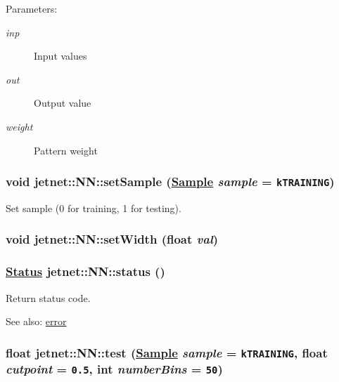 \begin{Desc}
\item[Parameters:]
\begin{description}
\item[{\em inp}]Input values \item[{\em out}]Output value \item[{\em weight}]Pattern weight \end{description}
\end{Desc}
\hypertarget{classjetnet_1_1NN_a13}{
\subsubsection[setSample]{\setlength{\rightskip}{0pt plus 5cm}void jetnet::NN::set\-Sample (\hyperlink{classjetnet_1_1NN_w17}{Sample} {\em sample} = {\tt kTRAINING})}}
\label{classjetnet_1_1NN_a13}


Set sample (0 for training, 1 for testing). 

\hypertarget{classjetnet_1_1NN_a10}{
\subsubsection[setWidth]{\setlength{\rightskip}{0pt plus 5cm}void jetnet::NN::set\-Width (float {\em val})}}
\label{classjetnet_1_1NN_a10}


\hypertarget{classjetnet_1_1NN_a34}{
\subsubsection[status]{\setlength{\rightskip}{0pt plus 5cm}\hyperlink{classjetnet_1_1NN_w19}{Status} jetnet::NN::status ()}}
\label{classjetnet_1_1NN_a34}


Return status code. 

\begin{Desc}
\item[See also:]\hyperlink{classjetnet_1_1NN_a28}{error} \end{Desc}
\hypertarget{classjetnet_1_1NN_a24}{
\subsubsection[test]{\setlength{\rightskip}{0pt plus 5cm}float jetnet::NN::test (\hyperlink{classjetnet_1_1NN_w17}{Sample} {\em sample} = {\tt kTRAINING}, float {\em cutpoint} = {\tt 0.5}, int {\em number\-Bins} = {\tt 50})}}
\label{classjetnet_1_1NN_a24}


